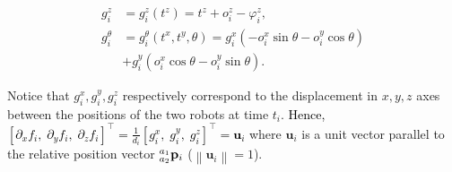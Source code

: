 \documentclass[journal]{IEEEtran}
\newcommand{\norm}[1]{\left\lVert#1\right\rVert}
\def\RelPosUWBAnts{\prescript{a_1}{a_2}{\mathbf{p}}}
\begin{document}
\begin{appendices}
\begin{equation*}
\begin{aligned}
    g^z_i &= g^z_i (t^z) = t^z + o^z_i - \varphi^z_i,\\
    g^{\theta}_i 
    &= g^{\theta}_i (t^x, t^y, \theta) 
    = g^x_i(-o^x_i \sin{\theta}  - o^y_i \cos{\theta})\\ 
    &+ g^y_i(o^x_i \cos{\theta} - o^y_i \sin{\theta}).
\end{aligned}
\end{equation*}

Notice that $g^x_i,g^y_i,g^z_i$ respectively correspond to the displacement in $x,y,z$ axes between the positions of the two robots at time $t_i$. \textcolor{black}{Hence, ${\left[\partial_x f_i, \; \partial_y f_i, \; \partial_z f_i \right]^\top = \frac{1}{d_i}\left[g^x_i,\; g^y_i,\;g^z_i\right]^\top = \mathbf{u}_i}$} where $\mathbf{u}_i$ is a unit vector parallel to the relative position vector $\RelPosUWBAnts_i$ ($\norm{\mathbf{u}_i} = 1$).


\end{appendices}
\end{document}
